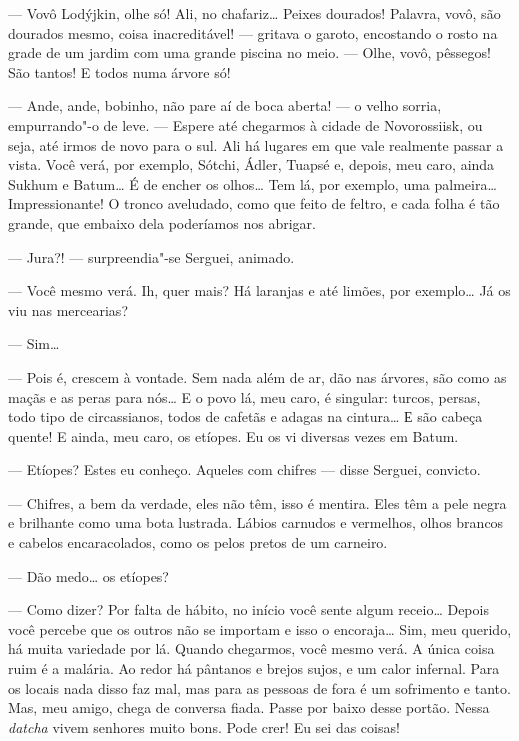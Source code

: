 --- Vovô Lodýjkin, olhe só! Ali, no chafariz\ldots{} Peixes dourados!
Palavra, vovô, são dourados mesmo, coisa inacreditável! --- gritava o
garoto, encostando o rosto na grade de um jardim com uma grande piscina
no meio. --- Olhe, vovô, pêssegos! São tantos! E todos numa árvore só!

--- Ande, ande, bobinho, não pare aí de boca aberta! --- o velho sorria,
empurrando"-o de leve. --- Espere até chegarmos à cidade de Novorossiisk,
ou seja, até irmos de novo para o sul. Ali há lugares em que vale
realmente passar a vista. Você verá, por exemplo, Sótchi, Ádler, Tuapsé
e, depois, meu caro, ainda Sukhum e Batum\ldots{} É de encher os olhos\ldots{} Tem
lá, por exemplo, uma palmeira\ldots{} Impressionante! O tronco aveludado, como
que feito de feltro, e cada folha é tão grande, que embaixo dela
poderíamos nos abrigar.

--- Jura?! --- surpreendia"-se Serguei, animado.

--- Você mesmo verá. Ih, quer mais? Há laranjas e até limões, por
exemplo\ldots{} Já os viu nas mercearias?

--- Sim\ldots{}

--- Pois é, crescem à vontade. Sem nada além de ar, dão nas árvores, são
como as maçãs e as peras para nós\ldots{} E o povo lá, meu caro, é singular:
turcos, persas, todo tipo de circassianos, todos de cafetãs e adagas na
cintura\ldots{} Е são cabeça quente! E ainda, meu caro, os etíopes. Eu os vi
diversas vezes em Batum.

--- Etíopes? Estes eu conheço. Aqueles com chifres --- disse Serguei,
convicto.

--- Chifres, a bem da verdade, eles não têm, isso é mentira. Eles têm a
pele negra e brilhante como uma bota lustrada. Lábios carnudos e
vermelhos, olhos brancos e cabelos encaracolados, como os pelos pretos
de um carneiro.

--- Dão medo\ldots{} os etíopes?

--- Como dizer? Por falta de hábito, no início você sente algum
receio\ldots{} Depois você percebe que os outros não se importam e isso o
encoraja\ldots{} Sim, meu querido, há muita variedade por lá. Quando
chegarmos, você mesmo verá. A única coisa ruim é a malária. Ao redor há
pântanos e brejos sujos, e um calor infernal. Para os locais nada disso faz mal, mas para as pessoas de fora é um sofrimento e tanto. Mas,
meu amigo, chega de conversa fiada. Passe por baixo desse portão. Nessa
\emph{datcha} vivem senhores muito bons. Pode crer! Eu sei das coisas!

